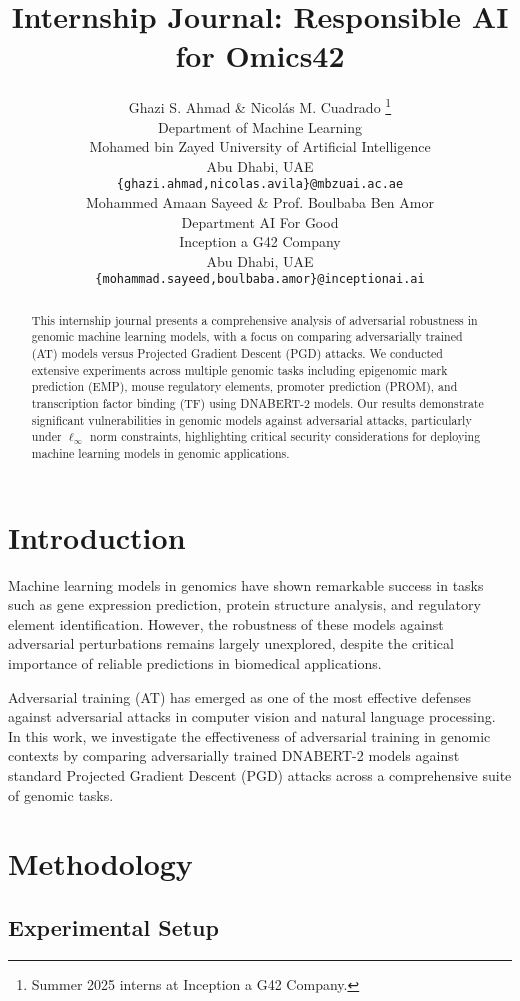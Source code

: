 \documentclass{article} %
\title{Internship Journal: Responsible AI for Omics42}
\author{Ghazi S. Ahmad \& Nicolás M. Cuadrado \thanks{Summer 2025 interns at Inception a G42 Company.} \\
    Department of Machine Learning\\
    Mohamed bin Zayed University of Artificial Intelligence\\
    Abu Dhabi, UAE \\
    \texttt{\{ghazi.ahmad,nicolas.avila\}@mbzuai.ac.ae} \\
    \AND
    Mohammed Amaan Sayeed \& Prof. Boulbaba Ben Amor \\
    Department AI For Good \\
    Inception a G42 Company \\
    Abu Dhabi, UAE \\
    \texttt{\{mohammad.sayeed,boulbaba.amor\}@inceptionai.ai} \\
    }
\begin{document}
\maketitle

\begin{abstract}
This internship journal presents a comprehensive analysis of adversarial robustness in genomic machine learning models, with a focus on comparing adversarially trained (AT) models versus Projected Gradient Descent (PGD) attacks. We conducted extensive experiments across multiple genomic tasks including epigenomic mark prediction (EMP), mouse regulatory elements, promoter prediction (PROM), and transcription factor binding (TF) using DNABERT-2 models. Our results demonstrate significant vulnerabilities in genomic models against adversarial attacks, particularly under $\ell_\infty$ norm constraints, highlighting critical security considerations for deploying machine learning models in genomic applications.
\end{abstract}

\section{Introduction}

Machine learning models in genomics have shown remarkable success in tasks such as gene expression prediction, protein structure analysis, and regulatory element identification. However, the robustness of these models against adversarial perturbations remains largely unexplored, despite the critical importance of reliable predictions in biomedical applications.

Adversarial training (AT) has emerged as one of the most effective defenses against adversarial attacks in computer vision and natural language processing. In this work, we investigate the effectiveness of adversarial training in genomic contexts by comparing adversarially trained DNABERT-2 models against standard Projected Gradient Descent (PGD) attacks across a comprehensive suite of genomic tasks.

\section{Methodology}

\subsection{Experimental Setup}
\end{document}
